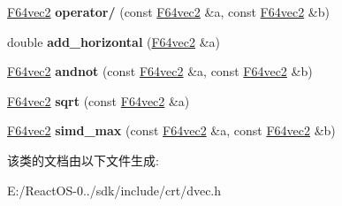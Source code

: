 \begin{DoxyCompactItemize}
\item 
\mbox{\label{class_f64vec2_a27309912646da1e6fa15c8728b5075c4}} 
\hyperlink{class_f64vec2}{F64vec2} {\bfseries operator/} (const \hyperlink{class_f64vec2}{F64vec2} \&a, const \hyperlink{class_f64vec2}{F64vec2} \&b)
\item 
\mbox{\label{class_f64vec2_a60e71356e1b9a415d7a21684d7993d11}} 
double {\bfseries add\+\_\+horizontal} (\hyperlink{class_f64vec2}{F64vec2} \&a)
\item 
\mbox{\label{class_f64vec2_a790a03786d6c460371112e9fc5ce5cc8}} 
\hyperlink{class_f64vec2}{F64vec2} {\bfseries andnot} (const \hyperlink{class_f64vec2}{F64vec2} \&a, const \hyperlink{class_f64vec2}{F64vec2} \&b)
\item 
\mbox{\label{class_f64vec2_a5ee350b2f4455a7516a927ebe67c01db}} 
\hyperlink{class_f64vec2}{F64vec2} {\bfseries sqrt} (const \hyperlink{class_f64vec2}{F64vec2} \&a)
\item 
\mbox{\label{class_f64vec2_a4a3c853220f2eaa93952a24e7a77b630}} 
\hyperlink{class_f64vec2}{F64vec2} {\bfseries simd\+\_\+max} (const \hyperlink{class_f64vec2}{F64vec2} \&a, const \hyperlink{class_f64vec2}{F64vec2} \&b)
\end{DoxyCompactItemize}


该类的文档由以下文件生成\+:\begin{DoxyCompactItemize}
\item 
E\+:/\+React\+O\+S-\/0../sdk/include/crt/dvec.\+h\end{DoxyCompactItemize}
